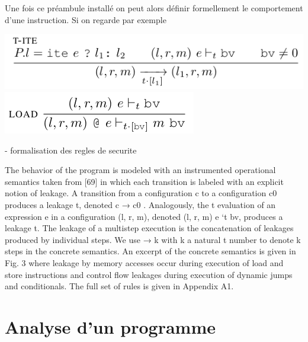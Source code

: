 Une fois ce préambule installé on peut alors définir formellement le comportement d'une instruction. Si on regarde par exemple 

\includegraphics{pictures/branchement.png}
\includegraphics{pictures/load.png}
\newpage



- formalisation des regles de securite


The behavior of the program is modeled
with an instrumented operational semantics taken from [69]
in which each transition is labeled with an explicit notion of
leakage. A transition from a configuration c to a configuration
c0 produces a leakage t, denoted c → c0 . Analogously, the
t
evaluation of an expression e in a configuration (l, r, m),
denoted (l, r, m) e `t bv, produces a leakage t. The leakage
of a multistep execution is the concatenation of leakages
produced by individual steps. We use → k with k a natural
t
number to denote k steps in the concrete semantics.
An excerpt of the concrete semantics is given in Fig. 3
where leakage by memory accesses occur during execution of
load and store instructions and control flow leakages during
execution of dynamic jumps and conditionals. The full set of
rules is given in Appendix A1.



\cite{binsecRel2019}


\section{Analyse d'un programme}


